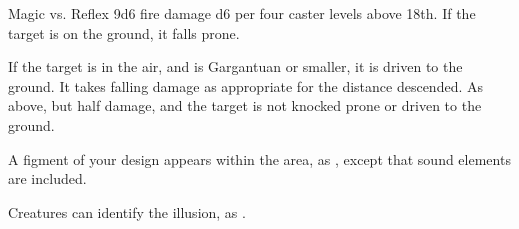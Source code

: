 \begin{spellheader}
    \spellrng{\rnglong}
\end{spellheader}
\begin{spelleffects}
    \begin{spellattack}{Magic vs. Reflex}
        \spellsuccess 9d6 fire damage \add d6 per four caster levels above 18th. If the target is on the ground, it falls prone.

        If the target is in the air, and is Gargantuan or smaller, it is driven to the ground. It takes falling damage as appropriate for the distance descended.
        \spellfailure As above, but half damage, and the target is not knocked prone or driven to the ground.
    \end{spellattack}
\end{spelleffects}
\begin{spellfooter}
    \spellnotes \firespellnotes

    \destructivespellnotes
\end{spellfooter}

\begin{spellheader}
    \spelldur{\durshort}
\end{spellheader}
\begin{spelleffects}
    \spelleffect A figment of your design appears within the area, as , except that sound elements are included.
\end{spelleffects}
\begin{spellfooter}
    \spellnotes Creatures can identify the illusion, as .
\end{spellfooter}

